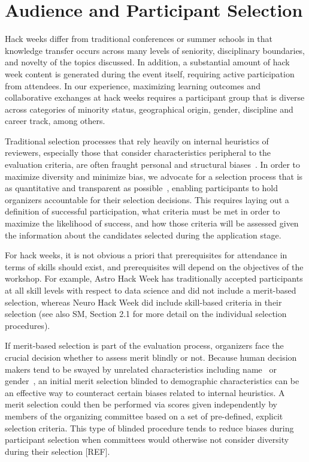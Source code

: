 \section*{Audience and Participant Selection}

Hack weeks differ from traditional conferences or summer schools in that knowledge transfer occurs across many levels of seniority, disciplinary boundaries, and novelty of the topics discussed.
In addition, a substantial amount of hack week content is generated during the event itself, requiring active participation from attendees.
In our experience, maximizing learning outcomes and collaborative exchanges at hack weeks requires a participant group that is diverse across categories of minority status, geographical origin, gender, discipline and career track, among others. 

Traditional selection processes that rely heavily on internal heuristics of reviewers, especially those that consider characteristics peripheral to the evaluation criteria, are often fraught personal and structural biases~\cite[e.g.][]{sunstein2015wiser}. 
In order to maximize diversity and minimize bias, we advocate for a selection process that is as quantitative and transparent as possible~\cite{sunstein2015wiser}, enabling participants to hold organizers accountable for their selection decisions.
This requires laying out a definition of successful participation, what criteria must be met in order to maximize the likelihood of success, and how those criteria will be assessed given the information about the candidates selected during the application stage.  

For hack weeks, it is not obvious a priori that prerequisites for attendance in terms of skills should exist, and prerequisites will depend on the objectives of the workshop. For example, Astro Hack Week has traditionally accepted participants at all skill levels with respect to data science and did not include a merit-based selection, whereas Neuro Hack Week did include skill-based criteria in their selection (see also SM, Section 2.1 for more detail on the individual selection procedures). 

If merit-based selection is part of the evaluation process, organizers face the crucial decision whether to assess merit blindly or not. Because human decision makers tend to be swayed by unrelated characteristics including name~\cite{bertrand2004} or gender~\cite{mossracusin2012}, an initial merit selection blinded to demographic characteristics can be an effective way to counteract certain biases related to internal heuristics. A merit selection could then be performed via scores given independently by members of the organizing committee based on a set of pre-defined, explicit selection criteria. This type of blinded procedure tends to reduce biases during participant selection when committees would otherwise not consider diversity during their selection [REF]. 

